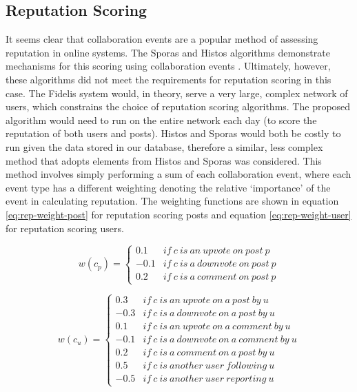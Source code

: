 \subsection{Reputation Scoring}
It seems clear that collaboration events are a popular method of assessing reputation in online systems. The Sporas and Histos algorithms demonstrate mechanisms for this scoring using collaboration events \cite{mcnally2013} \cite{zacharia2000}. Ultimately, however, these algorithms did not meet the requirements for reputation scoring in this case. The Fidelis system would, in theory, serve a very large, complex network of users, which constrains the choice of reputation scoring algorithms. The proposed algorithm would need to run on the entire network each day (to score the reputation of both users and posts). Histos and Sporas would both be costly to run given the data stored in our database, therefore a similar, less complex method that adopts elements from Histos and Sporas was considered. This method involves simply performing a sum of each collaboration event, where each event type has a different weighting denoting the relative `importance' of the event in calculating reputation. The weighting functions are shown in equation \ref{eq:rep-weight-post} for reputation scoring posts and equation \ref{eq:rep-weight-user} for reputation scoring users.

\begin{equation}
    \label{eq:rep-weight-post}
     w(c_p) = \left\{\begin{matrix}
            0.1 & if\ c\ is\ an\ upvote\ on\ post\ p \\ 
            -0.1 & if\ c\ is\ a\ downvote\ on\ post\ p \\ 
            0.2 & if\ c\ is\ a\ comment\ on\ post\ p
    \end{matrix}\right.
\end{equation}

\begin{equation}
    \label{eq:rep-weight-user}
        w(c_u) = \left\{\begin{matrix}
            0.3 & if\ c\ is\ an\ upvote\ on\ a\ post\ by\ u\\ 
            -0.3 & if\ c\ is\ a\ downvote\ on\ a\ post\ by\ u \\ 
            0.1 & if\ c\ is\ an\ upvote\ on\ a\ comment\ by\ u \\ 
            -0.1 & if\ c\ is\ a\ downvote\ on\ a\ comment\ by\ u \\ 
            0.2 & if\ c\ is\ a\ comment\ on\ a\ post\ by\ u\\ 
            0.5 & if\ c\ is\ another\ user\ following\ u\\
            -0.5 & if\ c\ is\ another\ user\ reporting\ u
        \end{matrix}\right.
\end{equation}

